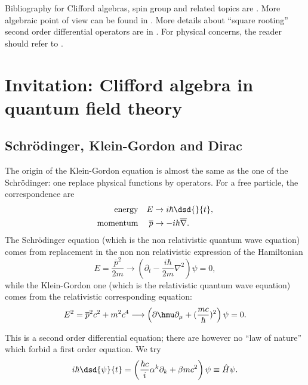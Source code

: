 
Bibliography for Clifford algebras, spin group and related topics are \cite{memP,Michelson,Witkowski,mellor,ResEtaDiracType}. More algebraic point of view  can be found in \cite{Fult,Chevalley}. More details about ``square rooting'' second order differential operators are in \cite{Bronn}. For physical concerns, the reader should refer to \cite{Weinberg,Peskin,schwabl}.

\section{Invitation: Clifford algebra in quantum field theory}

\label{Secqft}
\subsection{Schrödinger, Klein-Gordon and Dirac}

The origin of the Klein-Gordon equation is almost the same as the one of the Schrödinger: one replace physical functions by operators. For a free particle, the correspondence are
\begin{align*}
 \textrm{energy}&& E&\rightarrow i\hbar\dsd{}{t},\\
 \textrm{momentum}&& \overline{p}&\rightarrow -i\hbar\overline{ \nabla }.
\end{align*}
The Schrödinger equation (which is the non relativistic quantum wave equation) comes from replacement in the non non relativistic expression of the Hamiltonian
\[
E=\frac{\overline{p}^2}{2m}\longrightarrow\left(\partial_t-\frac{i\hbar}{2m}\nabla^2\right)\psi=0,
\]
while the Klein-Gordon one (which is the relativistic quantum wave equation) comes from the relativistic corresponding equation:
\[
E^2=\overline{p}^2c^2+m^2c^4\longrightarrow\left(\partial\hmu\partial_{\mu}+(\frac{mc}{\hbar})^2\right)\psi=0.
\]

This is a second order differential equation; there are however no ``law of nature''{} which forbid a first order equation. We try
\[
 i\hbar\dsd{\psi}{t}
 =\left(\frac{\hbar c}{i}\alpha^k\partial_k+\beta mc^2\right)\psi\equiv \hat{H}\psi.
\]

